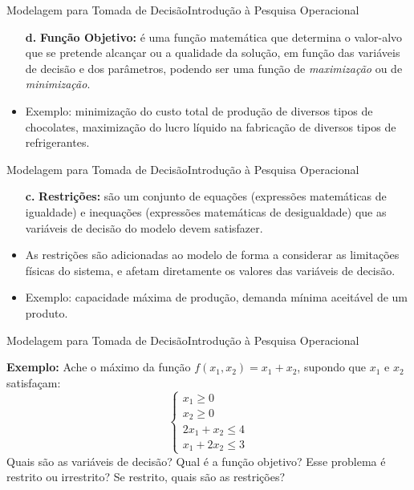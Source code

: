 \documentclass[t]{beamer}
\begin{document}
\begin{ftst}{Modelagem para Tomada de Decisão}{Introdução à Pesquisa Operacional}

\begin{itemize}
    \item[\textbf{d.}] \textbf{Função Objetivo:} é uma função matemática que determina o valor-alvo que se pretende alcançar ou a qualidade da solução, em função das variáveis de decisão e dos parâmetros, podendo ser uma função de \textit{maximização} ou de \textit{minimização}.
    \vone
    \item Exemplo: minimização do custo total de produção de diversos tipos de chocolates, maximização do lucro líquido na fabricação de diversos tipos de refrigerantes.
\end{itemize}

\end{ftst}


\begin{ftst}{Modelagem para Tomada de Decisão}{Introdução à Pesquisa Operacional}

\begin{itemize}
    \item[\textbf{c.}] \textbf{Restrições:} são um conjunto de equações (expressões matemáticas de igualdade) e inequações (expressões matemáticas de desigualdade) que as variáveis de decisão do modelo devem satisfazer. 
    \vone
    \item As restrições são adicionadas ao modelo de forma a considerar as limitações físicas do sistema, e afetam diretamente os valores das variáveis de decisão. 
    \vone
    \item Exemplo: capacidade máxima de produção, demanda mínima aceitável de um produto.
\end{itemize}

\end{ftst}


\begin{ftst}{Modelagem para Tomada de Decisão}{Introdução à Pesquisa Operacional}

\textbf{Exemplo:} Ache o máximo da função $f(x_1,x_2) = x_1 + x_2$, supondo que $x_1$ e $x_2$ satisfaçam:
\begin{equation*}
    \left\{\begin{matrix}
        x_1 \geq 0
        \\ x_2 \geq 0
        \\ 2x_1 + x_2 \leq 4
        \\ x_1 + 2x_2 \leq 3
\end{matrix}\right.
\end{equation*}
\vone
Quais são as variáveis de decisão? 
\vone
Qual é a função objetivo? 
\vone
Esse problema é restrito ou irrestrito? 
\vone
Se restrito, quais são as restrições?

\end{ftst}
\end{document}
